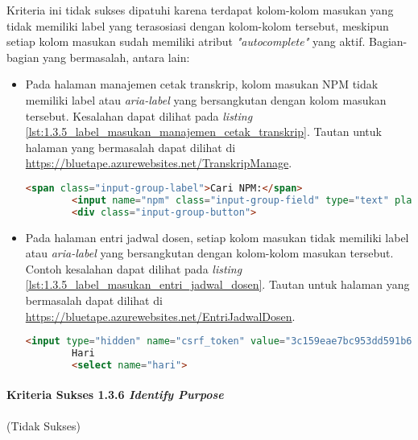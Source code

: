 Kriteria ini tidak sukses dipatuhi karena terdapat kolom-kolom masukan yang tidak memiliki label yang terasosiasi dengan kolom-kolom tersebut, meskipun setiap kolom masukan sudah memiliki atribut \textit{"autocomplete"} yang aktif. Bagian-bagian yang bermasalah, antara lain:
\begin{itemize}
    \item Pada halaman manajemen cetak transkrip, kolom masukan NPM tidak memiliki label atau \textit{aria-label} yang bersangkutan dengan kolom masukan tersebut. Kesalahan dapat dilihat pada \textit{listing} \ref{lst:1.3.5_label_masukan_manajemen_cetak_transkrip}. Tautan untuk halaman yang bermasalah dapat dilihat di \url{https://bluetape.azurewebsites.net/TranskripManage}.
    \begin{lstlisting}[frame=single, label={lst:1.3.5_label_masukan_manajemen_cetak_transkrip}, language=HTML, caption=Pelanggaran Kriteria Sukses 1.3.5 pada Halaman Manajemen Cetak Transkrip]
        <span class="input-group-label">Cari NPM:</span>
        <input name="npm" class="input-group-field" type="text" placeholder="2013730013" maxlength="10" minlength="10"/>
        <div class="input-group-button">
    \end{lstlisting}
    
    \item Pada halaman entri jadwal dosen, setiap kolom masukan tidak memiliki label atau \textit{aria-label} yang bersangkutan dengan kolom-kolom masukan tersebut. Contoh kesalahan dapat dilihat pada \textit{listing} \ref{lst:1.3.5_label_masukan_entri_jadwal_dosen}. Tautan untuk halaman yang bermasalah dapat dilihat di \url{https://bluetape.azurewebsites.net/EntriJadwalDosen}.
    \begin{lstlisting}[frame=single, label={lst:1.3.5_label_masukan_entri_jadwal_dosen}, language=HTML, caption=Pelanggaran Kriteria Sukses 1.3.5 pada Halaman Entri Jadwal Dosen]
        <input type="hidden" name="csrf_token" value="3c159eae7bc953dd591b679c080ed066" />
        Hari
        <select name="hari">
    \end{lstlisting}
\end{itemize}

\paragraph{Kriteria Sukses 1.3.6 \textit{Identify Purpose}}
\label{par:kepatuhan_bluetape_kriteria_sukses_1.3.6}
(Tidak Sukses)\\

